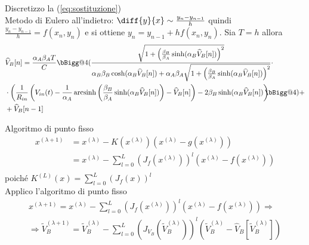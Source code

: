 \documentclass[12pt]{article}
\makeatletter
\DeclareMathOperator{\arcsinh}{arcsinh}
\newcommand{\reallybig}{\bBigg@{4}}
\makeatother
\begin{document}
		Discretizzo la (\ref{eq:sostituzione})\\
		Metodo di Eulero all'indietro: $\diff{y}{x} \sim \frac{y_{n}-y_{n-1}}{h}$ quindi $\frac{y_{n}-y_{n-1}}{h} = f(x_{n},y_{n})$ e si ottiene $y_{n} = y_{n-1}+hf(x_{n},y_{n})$. Sia $T = h$ allora
		\begin{equation}
			\label{eq:discretizzazione}
			\begin{split}
				&\widehat V_{B}[n] = \frac{\alpha_{A}\beta_{A}T}{C}\reallybig(\frac{\sqrt{1+\left(\frac{\beta_{B}}{\beta_{A}}\sinh(\alpha_{B}\widehat V_{B}[n])\right)^{2}}}{\alpha_{B}\beta_{B}\cosh(\alpha_{B}\widehat V_{B}[n])+\alpha_{A}\beta_{A}\sqrt{1+\left(\frac{\beta_{B}}{\beta_{A}}\sinh(\alpha_{B}\widehat V_{B}[n])\right)^{2}}}\cdot\\&\cdot\left(\frac{1}{R_{in}}\left(V_{in}(t)-\frac{1}{\alpha_{A}} \arcsinh \left(\frac{\beta_{B}}{\beta_{A}} \sinh(\alpha_{B}\widehat V_{B}[n])\right)-\widehat V_{B}[n]\right)-2\beta_{B}\sinh(\alpha_{B}\widehat V_{B}[n])\right)\hspace{-7px}\reallybig)+\\&+\widehat V_{B}[n-1]\\
			\end{split}
		\end{equation}
		
		Algoritmo di punto fisso
		\begin{equation}
			\label{eq:punto_fisso1}
			\begin{split}
				x^{(\lambda+1)} &= x^{(\lambda)}-K(x^{(\lambda)})(x^{(\lambda)}-g(x^{(\lambda)}))\\
				&= x^{(\lambda)}-\sum_{l=0}^{L} \left(J_{f}(x^{(\lambda)})\right)^{l}(x^{(\lambda)}-f(x^{(\lambda)}))\\
			\end{split}
		\end{equation}
		poiché $K^{(L)}(x) = \sum_{l=0}^{L} \left(J_{f}(x)\right)^{l}$\\
		
		Applico l'algoritmo di punto fisso
		\begin{equation}
			\label{eq:punto_fisso2}
			\begin{split}
				x^{(\lambda+1)} = x^{(\lambda)}-\sum_{l=0}^{L} \left(J_{f}(x^{(\lambda)})\right)^{l}(x^{(\lambda)}-f(x^{(\lambda)}))\Rightarrow\\
				\Rightarrow \widetilde V_{B}^{(\lambda+1)} = \widetilde V_{B}^{(\lambda)}-\sum_{l=0}^{L} \left(J_{V_{B}}(\widetilde V_{B}^{(\lambda)})\right)^{l}(\widetilde V_{B}^{(\lambda)}-\widehat V_{B}[\widetilde V_{B}^{(\lambda)}])
			\end{split}
		\end{equation}
		
\end{document}
